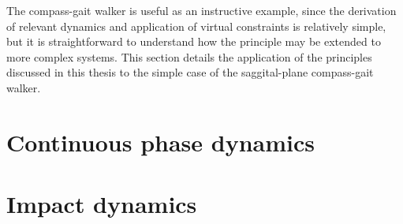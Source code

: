 The compass-gait walker is useful as an instructive example, since the derivation of relevant dynamics and application of virtual constraints is relatively simple, but it is straightforward to understand how the principle may be extended to more complex systems. This section details the application of the principles discussed in this thesis to the simple case of the saggital-plane compass-gait walker.

\section{Continuous phase dynamics}


\section{Impact dynamics}
